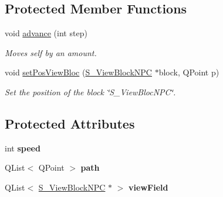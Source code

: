 \subsection*{Protected Member Functions}
\begin{DoxyCompactItemize}
\item 
void \hyperlink{class_c___enemy_a09e76be8e6f7d6037094057d10ee1cc6}{advance} (int step)
\begin{DoxyCompactList}\small\item\em Moves self by an amount. \end{DoxyCompactList}\item 
void \hyperlink{class_c___enemy_ae0e402984274dadd62a17150b21f63f7}{set\+Pos\+View\+Bloc} (\hyperlink{class_s___view_block_n_p_c}{S\+\_\+\+View\+Block\+N\+P\+C} $\ast$block, Q\+Point p)
\begin{DoxyCompactList}\small\item\em Set the position of the block \char`\"{}\+S\+\_\+\+View\+Bloc\+N\+P\+C\char`\"{}. \end{DoxyCompactList}\end{DoxyCompactItemize}
\subsection*{Protected Attributes}
\begin{DoxyCompactItemize}
\item 
\hypertarget{class_c___enemy_a9e77e1a4a2e282f95a9fde2cd1c3eff4}{}int {\bfseries speed}\label{class_c___enemy_a9e77e1a4a2e282f95a9fde2cd1c3eff4}

\item 
\hypertarget{class_c___enemy_a5cb585e57719eaca668ec27e1d8adf13}{}Q\+List$<$ Q\+Point $>$ {\bfseries path}\label{class_c___enemy_a5cb585e57719eaca668ec27e1d8adf13}

\item 
\hypertarget{class_c___enemy_adb18de5122d5a71c24baec391b9da344}{}Q\+List$<$ \hyperlink{class_s___view_block_n_p_c}{S\+\_\+\+View\+Block\+N\+P\+C} $\ast$ $>$ {\bfseries view\+Field}\label{class_c___enemy_adb18de5122d5a71c24baec391b9da344}

\end{DoxyCompactItemize}
